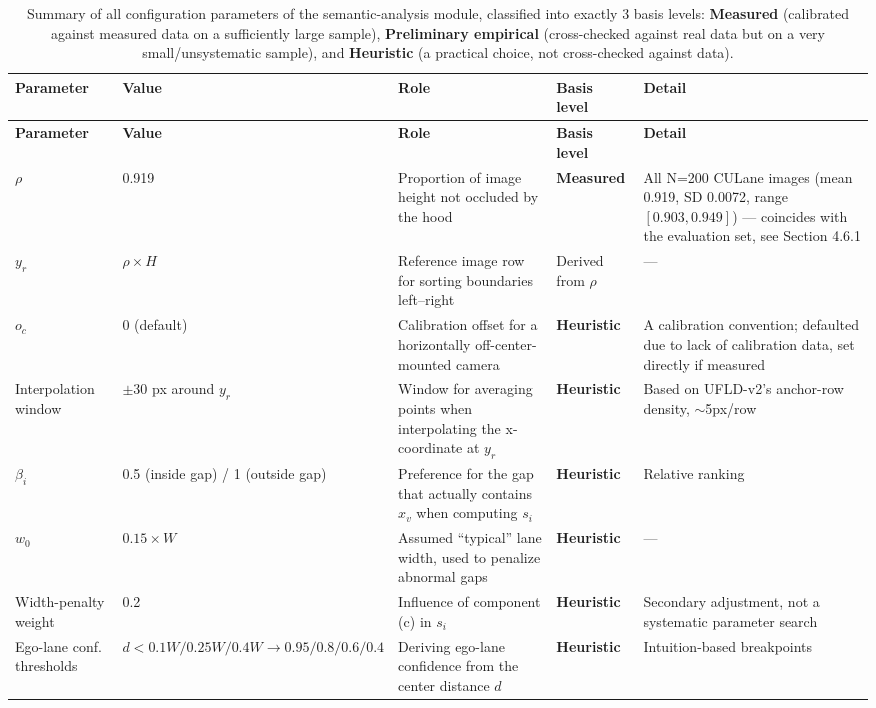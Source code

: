 \documentclass[12pt,a4paper]{report}
\begin{document}
\begin{longtable}{@{}p{1.6cm}p{2.4cm}p{4.0cm}p{2.0cm}p{4.4cm}@{}}
    \caption[Summary of the semantic-analysis module's configuration parameters]{Summary of all configuration parameters of the semantic-analysis module, classified into exactly 3 basis levels: \textbf{Measured} (calibrated against measured data on a sufficiently large sample), \textbf{Preliminary empirical} (cross-checked against real data but on a very small/unsystematic sample), and \textbf{Heuristic} (a practical choice, not cross-checked against data).}
    \label{tab:3.3} \\
    \toprule
    \textbf{Parameter} & \textbf{Value} & \textbf{Role} & \textbf{Basis level} & \textbf{Detail} \\
    \midrule
    \endfirsthead
    \toprule
    \textbf{Parameter} & \textbf{Value} & \textbf{Role} & \textbf{Basis level} & \textbf{Detail} \\
    \midrule
    \endhead
    $\rho$ & 0.919 & Proportion of image height not occluded by the hood & \textbf{Measured} & All N=200 CULane images (mean 0.919, SD 0.0072, range $[0.903, 0.949]$) --- coincides with the evaluation set, see Section 4.6.1 \\
    $y_r$ & $\rho \times H$ & Reference image row for sorting boundaries left--right & Derived from $\rho$ & --- \\
    $o_c$ & 0 (default) & Calibration offset for a horizontally off-center-mounted camera & \textbf{Heuristic} & A calibration convention; defaulted due to lack of calibration data, set directly if measured \\
    Interpolation window & $\pm 30$ px around $y_r$ & Window for averaging points when interpolating the x-coordinate at $y_r$ & \textbf{Heuristic} & Based on UFLD-v2's anchor-row density, $\sim$5px/row \\
    $\beta_i$ & 0.5 (inside gap) / 1 (outside gap) & Preference for the gap that actually contains $x_v$ when computing $s_i$ & \textbf{Heuristic} & Relative ranking \\
    $w_0$ & $0.15 \times W$ & Assumed ``typical'' lane width, used to penalize abnormal gaps & \textbf{Heuristic} & --- \\
    Width-penalty weight & 0.2 & Influence of component (c) in $s_i$ & \textbf{Heuristic} & Secondary adjustment, not a systematic parameter search \\
    Ego-lane conf. thresholds & $d<0.1W/0.25W/0.4W \to 0.95/0.8/0.6/0.4$ & Deriving ego-lane confidence from the center distance $d$ & \textbf{Heuristic} & Intuition-based breakpoints \\

\end{longtable}
\end{document}
